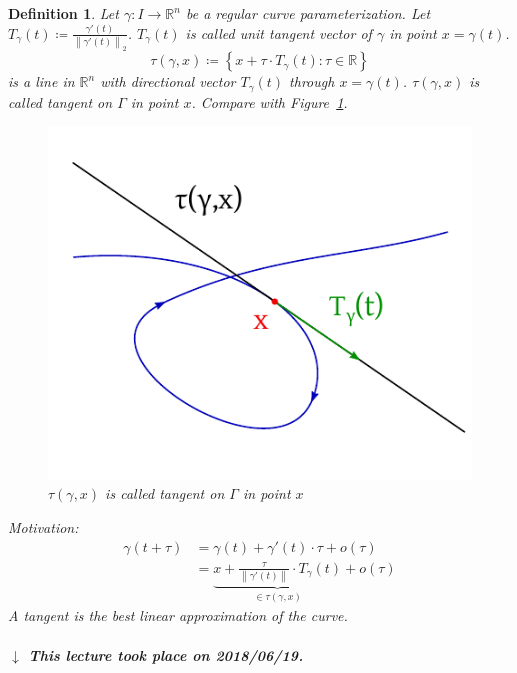\documentclass{article}
\newtheorem{definition}{Definition}  \numberwithin{definition}{section}
\newcommand{\set}[1]{\left\{#1\right\}}
\newcommand{\norm}[1]{\left\|#1\right\|}
\newcommand{\dateref}[1]{%
  \begin{mdframed}[backgroundcolor=gray!10,innerbottommargin=0pt,innertopmargin=0pt]
    \paragraph{\textit{$\downarrow$ This lecture took place on #1.}}%
  \end{mdframed}%
}
\begin{document}
\begin{definition} %
  Let $\gamma: I \to \mathbb R^n$ be a regular curve parameterization.
  Let $T_\gamma(t) \coloneqq \frac{\gamma'(t)}{\norm{\gamma'(t)}_2}$.
  $T_\gamma(t)$ is called \emph{unit tangent vector} of $\gamma$ in point $x = \gamma(t)$.
  \[ \tau(\gamma, x) \coloneqq \set{x + \tau \cdot T_{\gamma}(t): \tau \in \mathbb R} \]
  is a line in $\mathbb R^n$ with directional vector $T_\gamma(t)$ through $x = \gamma(t)$.
  $\tau(\gamma, x)$ is called \emph{tangent} on $\Gamma$ in point $x$.
  Compare with Figure~\ref{img:tangent}.

  \begin{figure}[t]
    \begin{center}
      \includegraphics{img/38_tangent.pdf}
      \caption{$\tau(\gamma, x)$ is called \emph{tangent} on $\Gamma$ in point $x$}
      \label{img:tangent}
    \end{center}
  \end{figure}

  Motivation:
  \begin{align*}
    \gamma(t + \tau) &= \gamma(t) + \gamma'(t) \cdot \tau + o(\tau) \\
      &= \underbrace{x + \frac{\tau}{\norm{\gamma'(t)}} \cdot T_{\gamma}(t)}_{\in \tau(\gamma, x)} + o(\tau)
  \end{align*}
  A tangent is the best linear approximation of the curve.
\end{definition}

\dateref{2018/06/19}
\end{document}
